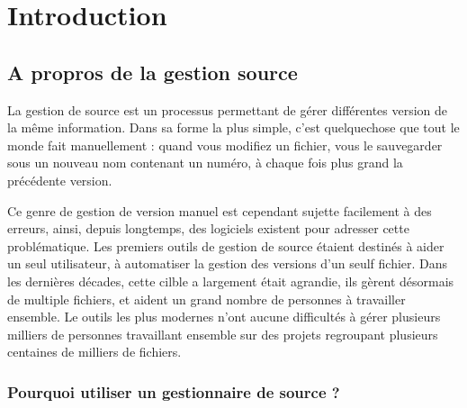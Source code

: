 \chapter{Introduction}
\label{chap:intro}

\section{A propros de la gestion source}

La gestion de source est un processus permettant de gérer différentes
version de la même information. Dans sa forme la plus simple, c'est
quelquechose que tout le monde fait manuellement : quand vous modifiez
un fichier, vous le sauvegarder sous un nouveau nom contenant un numéro,
à chaque fois plus grand la précédente version.

Ce genre de gestion de version manuel est cependant sujette facilement
à des erreurs, ainsi, depuis longtemps, des logiciels existent pour
adresser cette problématique. Les premiers outils de gestion de source
étaient destinés à aider un seul utilisateur, à automatiser la gestion
des versions d'un seulf fichier. Dans les dernières décades, cette cilble 
a largement était agrandie, ils gèrent désormais de multiple fichiers, et
aident un grand nombre de personnes à travailler ensemble. Le outils les
plus modernes n'ont aucune difficultés à gérer plusieurs milliers de 
personnes travaillant ensemble sur des projets regroupant plusieurs 
centaines de milliers de fichiers.

\subsection{Pourquoi utiliser un gestionnaire de source ?}

